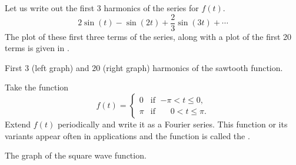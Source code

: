 \documentclass{ximera}
\begin{document}
\begin{exampleSol}
    Let us write out the first 3 harmonics of the series for $f(t)$.
    \begin{equation*}
        2  \sin (t) - \sin (2t) +\frac{2}{3} \sin (3t) + \cdots
    \end{equation*}
    The plot of these first three terms of the series, along with a plot of the first 20 terms is given in .
    
    \begin{myfig}
        \capstart
        \caption{First 3 (left graph) and 20 (right graph) harmonics of the sawtooth function.\label{ts:sawtoothfsfig}}
    \end{myfig}
\end{exampleSol}

\begin{example}
    Take the function
    \begin{equation*}
        f(t) =
        \begin{cases}
            0 & \text{if } \;{-\pi} < t \leq 0 , \\
            \pi & \text{if } \;\phantom{-}0 < t \leq \pi .
        \end{cases}
    \end{equation*}
    Extend $f(t)$ periodically and write it as a Fourier series.  This function or its variants appear often in applications and the function is called the \emph{}.
    
    \begin{myfig}
        \capstart
        \caption{The graph of the square wave function.\label{ts:squarewavefig}}
    \end{myfig}
\end{example}
\end{document}

